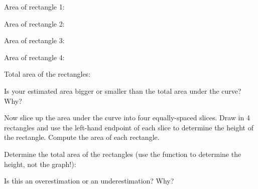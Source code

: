 \documentclass[11pt,fleqn]{article}
\begin{document}
Area of rectangle 1:
\vfill

Area of rectangle 2:
\vfill

Area of rectangle 3:
\vfill

Area of rectangle 4:
\vfill

Total area of the rectangles: 
\vfill

Is your estimated area bigger or smaller than the total area under the curve? Why?
\vfill

\newpage
\begin{adjustbox}{valign=t,minipage={.45\textwidth}}

\item Now slice up the area under the curve into four equally-spaced slices. Draw in 4 rectangles and use the {\sc left-hand endpoint} of each slice to determine the height of the rectangle. Compute the area of each rectangle.

\end{adjustbox}
\begin{adjustbox}{valign=t,minipage={.45\textwidth}}

\begin{center}
\end{center}
\end{adjustbox}

Determine the total area of the rectangles (use the function to determine the height, not the graph!):

\vspace{1in}

Is this an overestimation or an underestimation? Why?
\vfill
\end{document}
